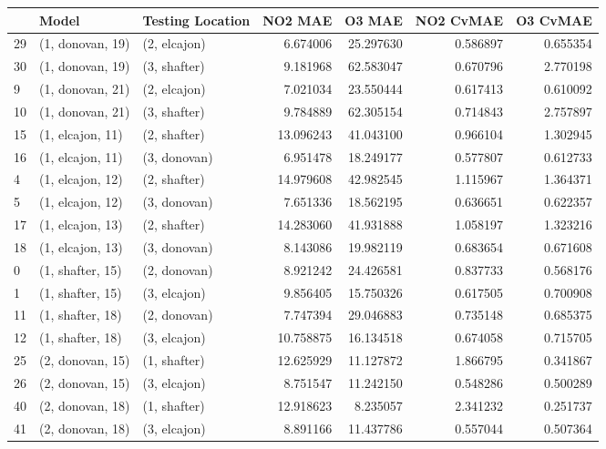 \begin{tabular}{lllrrrr}
\toprule
{} &             Model & Testing Location &    NO2 MAE &     O3 MAE &  NO2 CvMAE &  O3 CvMAE \\
\midrule
29 &  (1, donovan, 19) &     (2, elcajon) &   6.674006 &  25.297630 &   0.586897 &  0.655354 \\
30 &  (1, donovan, 19) &     (3, shafter) &   9.181968 &  62.583047 &   0.670796 &  2.770198 \\
9  &  (1, donovan, 21) &     (2, elcajon) &   7.021034 &  23.550444 &   0.617413 &  0.610092 \\
10 &  (1, donovan, 21) &     (3, shafter) &   9.784889 &  62.305154 &   0.714843 &  2.757897 \\
15 &  (1, elcajon, 11) &     (2, shafter) &  13.096243 &  41.043100 &   0.966104 &  1.302945 \\
16 &  (1, elcajon, 11) &     (3, donovan) &   6.951478 &  18.249177 &   0.577807 &  0.612733 \\
4  &  (1, elcajon, 12) &     (2, shafter) &  14.979608 &  42.982545 &   1.115967 &  1.364371 \\
5  &  (1, elcajon, 12) &     (3, donovan) &   7.651336 &  18.562195 &   0.636651 &  0.622357 \\
17 &  (1, elcajon, 13) &     (2, shafter) &  14.283060 &  41.931888 &   1.058197 &  1.323216 \\
18 &  (1, elcajon, 13) &     (3, donovan) &   8.143086 &  19.982119 &   0.683654 &  0.671608 \\
0  &  (1, shafter, 15) &     (2, donovan) &   8.921242 &  24.426581 &   0.837733 &  0.568176 \\
1  &  (1, shafter, 15) &     (3, elcajon) &   9.856405 &  15.750326 &   0.617505 &  0.700908 \\
11 &  (1, shafter, 18) &     (2, donovan) &   7.747394 &  29.046883 &   0.735148 &  0.685375 \\
12 &  (1, shafter, 18) &     (3, elcajon) &  10.758875 &  16.134518 &   0.674058 &  0.715705 \\
25 &  (2, donovan, 15) &     (1, shafter) &  12.625929 &  11.127872 &   1.866795 &  0.341867 \\
26 &  (2, donovan, 15) &     (3, elcajon) &   8.751547 &  11.242150 &   0.548286 &  0.500289 \\
40 &  (2, donovan, 18) &     (1, shafter) &  12.918623 &   8.235057 &   2.341232 &  0.251737 \\
41 &  (2, donovan, 18) &     (3, elcajon) &   8.891166 &  11.437786 &   0.557044 &  0.507364 \\

\end{tabular}
